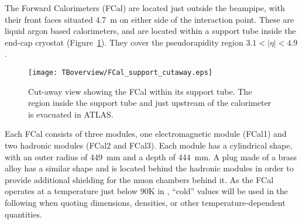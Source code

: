 


The \atlas Forward Calorimeters (FCal) are located just outside the beampipe, with their front faces situated 4.7~m on either side of the \atlas interaction point. These are liquid argon based calorimeters, and are located within a support tube inside the end-cap cryostat (Figure~\ref{fig_cut}). They cover the pseudorapidity region $3.1 < |\eta| < 4.9$.

\begin{figure}[tb]
\begin{center}
\texttt{[image: TBoverview/FCal\_support\_cutaway.eps]}
\end{center}
\caption[Cut-away view showing the FCal within its support tube]{Cut-away view showing the FCal within its support tube\cite{FCal_jinst_2010}. The region inside the support tube and just upstream of the calorimeter is evacuated in ATLAS.}
\label{fig_cut}
\end{figure}


Each FCal consists of three modules, one electromagnetic module (FCal1) and two hadronic modules (FCal2 and FCal3). Each module has a cylindrical shape, with an outer radius of 449~mm and a depth of 444~mm. A plug made of a brass alloy has a similar shape and is located behind the hadronic modules in order to provide additional shielding for the muon chambers behind it. As the FCal operates at a temperature just below 90K in \atlas, ``cold'' values will be used in the following when quoting dimensions, densities, or other temperature-dependent quantities. %

